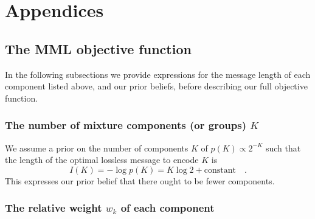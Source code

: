 \documentclass{elsarticle}
\newcommand{\prior}[1]{p\left(#1\right)}
\begin{document}
\section{Appendices}
\subsection{The MML objective function}
\label{app:mml_derivation}
In the following subsections we provide expressions for the message length of
each component listed above, and our prior beliefs, before describing our
full objective function.

\subsubsection{The number of mixture components (or groups) $K$}

We assume a prior on the number of components $K$ of $\prior{K} \propto 2^{-K}$
\cite[][p279, sec. 6.8.2]{Wallace05} such that the length of the 
optimal lossless message to encode $K$ is 
\begin{equation}
    I(K) = -\log{\prior{K}} = K\log{2} + \textrm{constant} \quad .
\end{equation}
This  expresses our prior belief that there ought to be fewer components.



\subsubsection{The relative weight $w_k$ of each component}
\end{document}
